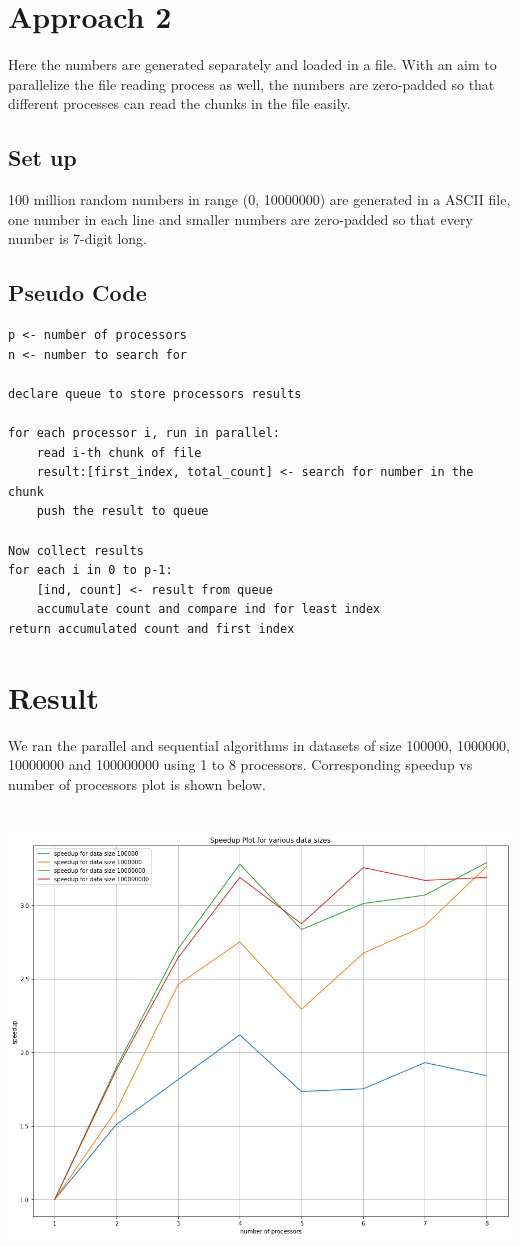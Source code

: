 \documentclass[12pt]{article}
\begin{document}
\section*{Approach 2}
Here the numbers are generated separately and loaded in a file. With an aim to parallelize the file reading process as well, the numbers are zero-padded so that different
processes can read the chunks in the file easily.

\subsection*{Set up}
100 million random numbers in range (0, 10000000) are generated in a ASCII file, one number in each line and smaller numbers are zero-padded so that every
number is 7-digit long.

\subsection*{Pseudo Code}
\begin{lstlisting}
p <- number of processors
n <- number to search for

declare queue to store processors results

for each processor i, run in parallel:
    read i-th chunk of file
    result:[first_index, total_count] <- search for number in the chunk
    push the result to queue

Now collect results
for each i in 0 to p-1:
    [ind, count] <- result from queue
    accumulate count and compare ind for least index
return accumulated count and first index
\end{lstlisting}

\section*{Result}
We ran the parallel and sequential algorithms in datasets of size 100000,
1000000, 10000000 and 100000000 using 1 to 8 processors. Corresponding speedup vs number of processors plot is shown below.

\includegraphics[width=15cm, height=12cm]{speedup-graph}
\end{document}

